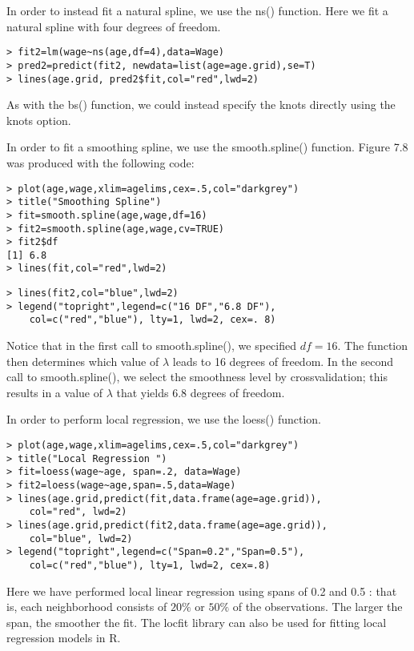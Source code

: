 \documentclass[10pt]{article}
\begin{document}
In order to instead fit a natural spline, we use the ns() function. Here we fit a natural spline with four degrees of freedom.

\begin{verbatim}
> fit2=lm(wage~ns(age,df=4),data=Wage)
> pred2=predict(fit2, newdata=list(age=age.grid),se=T)
> lines(age.grid, pred2$fit,col="red",lwd=2)
\end{verbatim}

As with the bs() function, we could instead specify the knots directly using the knots option.

In order to fit a smoothing spline, we use the smooth.spline() function. Figure 7.8 was produced with the following code:

\begin{verbatim}
> plot(age,wage,xlim=agelims,cex=.5,col="darkgrey")
> title("Smoothing Spline")
> fit=smooth.spline(age,wage,df=16)
> fit2=smooth.spline(age,wage,cv=TRUE)
> fit2$df
[1] 6.8
> lines(fit,col="red",lwd=2)
\end{verbatim}

\begin{verbatim}
> lines(fit2,col="blue",lwd=2)
> legend("topright",legend=c("16 DF","6.8 DF"),
    col=c("red","blue"), lty=1, lwd=2, cex=. 8)
\end{verbatim}

Notice that in the first call to smooth.spline(), we specified $d f=16$. The function then determines which value of $\lambda$ leads to 16 degrees of freedom. In the second call to smooth.spline(), we select the smoothness level by crossvalidation; this results in a value of $\lambda$ that yields 6.8 degrees of freedom.

In order to perform local regression, we use the loess() function.

\begin{verbatim}
> plot(age,wage,xlim=agelims,cex=.5,col="darkgrey")
> title("Local Regression ")
> fit=loess(wage~age, span=.2, data=Wage)
> fit2=loess(wage~age,span=.5,data=Wage)
> lines(age.grid,predict(fit,data.frame(age=age.grid)),
    col="red", lwd=2)
> lines(age.grid,predict(fit2,data.frame(age=age.grid)),
    col="blue", lwd=2)
> legend("topright",legend=c("Span=0.2","Span=0.5"),
    col=c("red","blue"), lty=1, lwd=2, cex=.8)
\end{verbatim}

Here we have performed local linear regression using spans of 0.2 and 0.5 : that is, each neighborhood consists of $20 \%$ or $50 \%$ of the observations. The larger the span, the smoother the fit. The locfit library can also be used for fitting local regression models in R.
\end{document}
